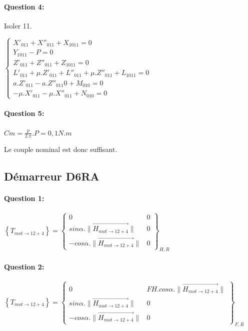 \paragraph{Question 4:}

Isoler 11.

$\left\{\begin{array}{l}
X'_{011}+X''_{011}+X_{1011}=0 \\
Y_{1011}-P=0 \\
Z'_{011}+Z''_{011}+Z_{1011}=0 \\
L'_{011}+\mu.Z'_{011}+L''_{011}+\mu.Z''_{011}+L_{1011}=0 \\
a.Z'_{011}-a.Z''_{011}0+M_{010}=0  \\
-\mu.X'_{011}-\mu.X''_{011}+N_{010}=0
\end{array}\right.$

\paragraph{Question 5:}

$Cm=\frac{p}{2.\pi}.P=0,1N.m$

Le couple nominal est donc suffisant.

\subsection{Démarreur D6RA}

\paragraph{Question 1:}

$\left\{T_{mot\rightarrow 12+4}\right\}=\left\{
\begin{array}{cc}
0 & 0 \\
sin\alpha.\|\overrightarrow{H_{mot\rightarrow 12+4}}\| & 0 \\
-cos\alpha.\|\overrightarrow{H_{mot\rightarrow 12+4}}\| & 0
\end{array}
\right\}_{H,R}$

\paragraph{Question 2:}

$\left\{T_{mot\rightarrow 12+4}\right\}=\left\{
\begin{array}{cc}
0 & FH.cos\alpha.\|\overrightarrow{H_{mot\rightarrow 12+4}}\| \\
sin\alpha.\|\overrightarrow{H_{mot\rightarrow 12+4}}\| & 0 \\
-cos\alpha.\|\overrightarrow{H_{mot\rightarrow 12+4}}\| & 0
\end{array}
\right\}_{F,R}$

